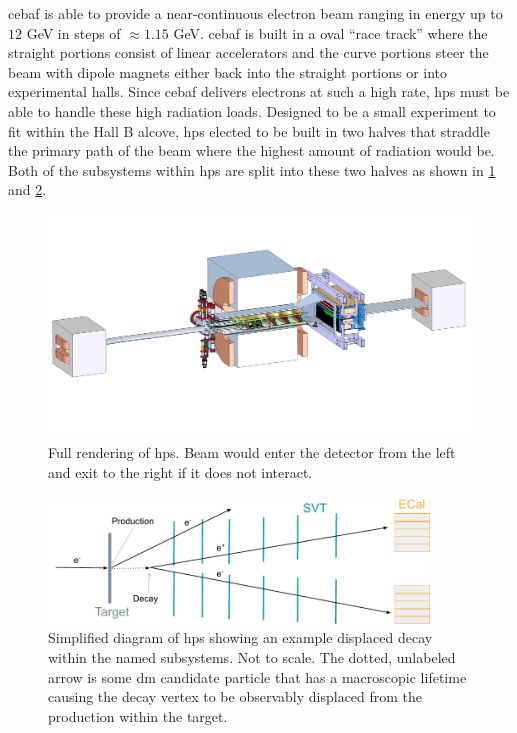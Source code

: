 \ac{cebaf} \cite{cebaf-12GeV-2012,cebaf-opportunities-2012,cebaf-2013} is able to
provide a near-continuous electron beam ranging in energy up to $12$ GeV in steps
of $\approx 1.15$ GeV. \ac{cebaf} is built in a oval ``race track'' where the straight
portions consist of linear accelerators and the curve portions steer the beam with
dipole magnets either back into the straight portions or into experimental halls.
Since \ac{cebaf} delivers electrons at such a high rate, \ac{hps} must be able to
handle these high radiation loads. Designed to be a small experiment to fit within
the Hall B alcove, \ac{hps} elected to be built in two halves that straddle the primary
path of the beam where the highest amount of radiation would be. Both of the subsystems
within \ac{hps} are split into these two halves as shown in \cref{fig:hps-full-render}
and \cref{fig:hps-diagram}.

\begin{figure}
	\centering
	\includegraphics[trim={15cm 10cm 10cm 5cm},clip,width=\textwidth]{figures/hps/experiment/hps_full_render.jpg}
	\caption{
		Full rendering of \ac{hps}.
		Beam would enter the detector from the left and exit to the right if it does not interact.
	}
	\label{fig:hps-full-render}
\end{figure}

\begin{figure}
	\centering
	\includegraphics[width=0.9\textwidth]{figures/hps/experiment/hps-diagram.pdf}
	\caption{
		Simplified diagram of \ac{hps} showing an example displaced decay within the named subsystems.
		Not to scale.
		The dotted, unlabeled arrow is some \ac{dm} candidate particle that has a macroscopic lifetime causing
		the decay vertex to be observably displaced from the production within the target.
	}
	\label{fig:hps-diagram}
\end{figure}

